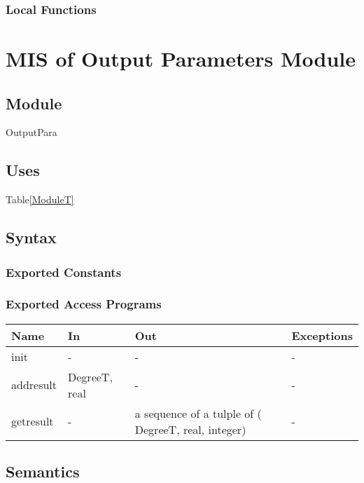 \documentclass[12pt, titlepage]{article}
\begin{document}
\subsubsection{Local Functions}

\section{MIS of Output Parameters Module} \label{ModuleOP} 

\subsection{Module}
OutputPara

\subsection{Uses}
Table\ref{ModuleT}\\

\subsection{Syntax}

\subsubsection{Exported Constants}


\subsubsection{Exported Access Programs}

\begin{center}
\begin{tabular}{p{2cm} p{5cm} p{5cm} p{2cm}}
\hline
\textbf{Name} & \textbf{In} & \textbf{Out} & \textbf{Exceptions} \\
\hline 
init & - & - & - \\
addresult &  DegreeT, real & - & - \\
getresult & - & a sequence of a tulple of ( DegreeT, real, integer) & - \\



\hline
\end{tabular}
\end{center}


\subsection{Semantics}
\end{document}

